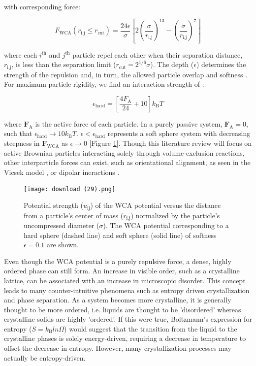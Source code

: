 \documentclass[11pt]{article}
\begin{document}
\noindent with corresponding force:
 
 \begin{equation}\label{LJForce}
  F_{\text{WCA}}(r_{\text{i,j}}\le r_{\text{cut}}) =
    \frac{24\epsilon}{\sigma}\left[2\left(\frac{\sigma}{r_{\text{i,j}}}\right)^{13}-\left(\frac{\sigma}{r_{\text{i,j}}}\right)^7\right]
\end{equation}

 \noindent where each $i^{\text{th}}$ and $j^{\text{th}}$ particle repel each other when their separation distance, $r_{\text{i,j}}$, is less than the separation limit ($r_{\text{cut}}=2^{1/6}\sigma$). The depth ($\epsilon$) determines the strength of the repulsion and, in turn, the allowed particle overlap and softness \cite{Kolb}. For maximum particle rigidity, we find an interaction strength of \cite{Kolb}:

\begin{equation}\label{HardEpsmono}
  \epsilon_\text{hard} =
    \left[\frac{4F_{\text{A}}}{24}+10\right]k_\text{B}T
\end{equation}

\noindent where $\boldsymbol{F}_{\text{A}}$ is the active force of each particle.  In a purely passive system, $\boldsymbol{F}_{\text{A}}=0$, such that  $\epsilon_{\text{hard}}\rightarrow10k_\text{B}T$. $\epsilon<\epsilon_{\text{hard}}$ represents a soft sphere system with decreasing steepness in $\boldsymbol{F}_{\text{WCA}}$ as $\epsilon\rightarrow0$ [Figure \ref{fig:WCA}]. Though this literature review will focus on active Brownian particles interacting solely through volume-exclusion reactions, other interparticle forces can exist, such as orientational alignment, as seen in the Vicsek model \cite{Vicsek}, or dipolar ineractions \cite{Goyal, Maloney}.

\begin{figure}[ht]
\centering\texttt{[image: download (29).png]}
\caption{Potential strength ($u_\text{ij}$) of the WCA potential versus the distance from a particle's center of mass ($r_\text{i,j}$) normalized by the particle's uncompressed diameter ($\sigma$).  The WCA potential corresponding to a hard sphere (dashed line) and soft sphere (solid line) of softness $\epsilon=0.1$ are shown.}
\label{fig:WCA}
\end{figure}

Even though the WCA potential is a purely repulsive force, a dense, highly ordered phase can still form. An increase in visible order, such as a crystalline lattice, can be associated with an increase in microscopic disorder.  This concept leads to many counter-intuitive phenomena such as entropy driven crystallization and phase separation. As a system becomes more crystalline, it is generally thought to be more ordered, i.e. liquids are thought to be 'disordered' whereas crystalline solids are highly 'ordered'.  If this were true, Boltzmann's expression for entropy ($S=k_\text{B}ln\Omega$) would suggest that the transition from the liquid to the crystalline phases is solely energy-driven, requiring a decrease in temperature to offset the decrease in entropy. However, many crystallization processes may actually be entropy-driven.  
\end{document}
